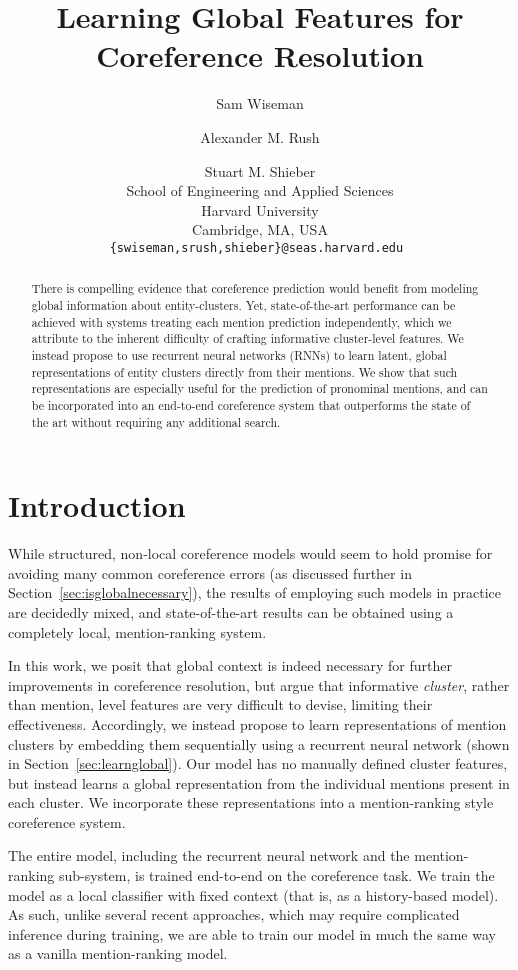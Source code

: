 \documentclass[11pt,letterpaper]{article}
\title{Learning Global Features for Coreference Resolution}
\author{Sam Wiseman \and Alexander M. Rush \and Stuart M. Shieber \\
         School of Engineering and Applied Sciences \\ Harvard University \\ Cambridge, MA, USA \\ {\tt \{swiseman,srush,shieber\}@seas.harvard.edu }}
\date{}
\begin{document}
\maketitle

\begin{abstract}
There is compelling evidence that coreference prediction would benefit from
modeling global information about entity-clusters.
Yet, state-of-the-art performance can be achieved with systems treating each mention prediction
  independently, which we attribute to the inherent
  difficulty of crafting informative cluster-level features. We instead propose to use recurrent neural networks
  (RNNs) to learn latent, global representations of entity clusters directly
  from their mentions. We show 
  that such representations are especially useful for the prediction of pronominal mentions, and can be incorporated into
  an end-to-end coreference system that outperforms the state of the art 
  without requiring any additional search.
\end{abstract}

\section{Introduction}
While structured, non-local coreference models would seem to hold promise for avoiding many common coreference errors (as discussed further in Section~\ref{sec:isglobalnecessary}), the results of employing such models in practice are decidedly mixed, and state-of-the-art results can be obtained using a completely local, mention-ranking system. 

In this work, we posit that global context is indeed necessary for further
improvements in coreference resolution, but argue that informative \textit{cluster}, rather than mention, level features are very difficult to devise, limiting
their effectiveness. Accordingly, we instead propose to learn representations of mention clusters by embedding them sequentially using a recurrent neural network (shown in Section~\ref{sec:learnglobal}). Our model has no manually defined cluster features, but instead learns a global representation from the individual mentions present in each cluster. We incorporate these representations into a mention-ranking style coreference system. 

The entire model, including the
recurrent neural network and the mention-ranking sub-system, is trained
end-to-end on the coreference task. We train the model as a local classifier with fixed context (that is, as a history-based model). As such, unlike several recent approaches, which may require complicated inference during training, we are able to train our model in much the same way as a vanilla mention-ranking model.
\end{document}
